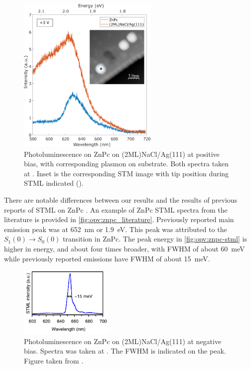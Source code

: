 \begin{figure} [H]
    \centering
    
        \includegraphics[width=0.6\textwidth]{pictures/znpc_+ve_emission_inset.png}
    
    \caption{Photoluminescence on ZnPc on (2ML)NaCl/Ag(111) at positive bias, with corresponding plasmon on substrate. Both spectra taken at . Inset is the corresponding STM image with tip position during STML indicated (). }
    \label{fig:opv:znpc-stml}
\end{figure}

There are notable differences between our results and the results of previous reports of \ac{STML} on ZnPc \citep{Zhang2016, Doppagne2017, Zhang2017, Doppagne2018}. An example of ZnPc \ac{STML} spectra from the literature is provided in \autoref{fig:opv:znpc_literature}. Previously reported main emission peak was at \SI{652}{nm} or \SI{1.9}{eV}. This peak was attributed to the $S_1(0) \rightarrow S_0(0)$ transition in ZnPc. The peak energy in \autoref{fig:opv:znpc-stml} is higher in energy, and about four times broader, with \ac{FWHM} of about \SI{60}{meV} while previously reported emissions have \ac{FWHM} of about \SI{15}{meV}.

\begin{figure}
    \centering
    \includegraphics[width=0.4\textwidth]{pictures/znpc_literature.PNG}
    \caption[]{Photoluminescence on ZnPc on (2ML)NaCl/Ag(111) at negative bias. Spectra was taken at . The FWHM is indicated on the peak. Figure taken from \citep{zhang2017sub}.}
    \label{fig:opv:znpc_literature}
\end{figure}

